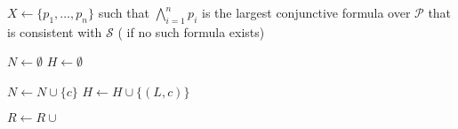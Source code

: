\begin{algorithm}[t]

    \label{sorcar:line:relevant-predicates-start}
    {
        \;
    }
    \label{sorcar:line:relevant-predicates-end}

    \BlankLine
    \BlankLine

    {
        $X \gets \{ p_1, \ldots, p_n \}$ such that $\bigwedge_{i=1}^n p_i$ is the largest conjunctive formula over $\mathcal P$ that is consistent with $\mathcal S$ ( if no such formula exists)\;
        \label{sorcar:line:largest-conjunction}

        \BlankLine

        {

            $N \gets \emptyset$%
            \label{sorcar:line:inconsistent-collextion-start}
            $H \gets \emptyset$%
        
            \BlankLine
    

            {
  	        	$N \gets N \cup \{ c \}$\;
            }
            {
  	        	$H \gets H \cup \{ (L, c) \}$\;
            }
            \label{sorcar:line:inconsistent-collextion-end}
        
            \BlankLine
        
            $R \gets R \cup {}$\;
            \label{sorcar:line:extend-R}

        }
        \label{sorcar:line:loop-end}

        \BlankLine
        
        \;
    }

    \BlankLine
    \BlankLine


\end{algorithm}
